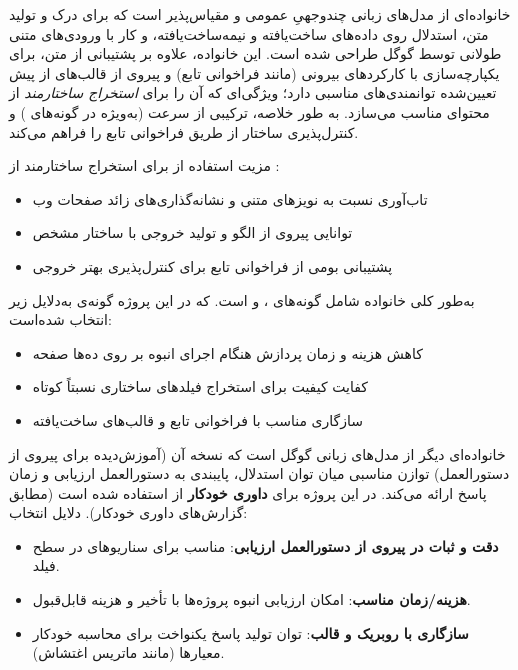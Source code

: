 

\textbf{} خانواده‌ای از مدل‌های زبانی چندوجهیِ عمومی و مقیاس‌پذیر است که برای درک و تولید متن، استدلال روی داده‌های ساخت‌یافته و نیمه‌ساخت‌یافته، و کار با ورودی‌های متنی طولانی توسط گوگل طراحی شده است. این خانواده، علاوه بر پشتیبانی از متن، برای یکپارچه‌سازی با کارکردهای بیرونی (مانند فراخوانی تابع) و پیروی از قالب‌های از پیش تعیین‌شده توانمندی‌های مناسبی دارد؛ ویژگی‌ای که آن را برای \textit{استخراج ساختارمند} از محتوای  مناسب می‌سازد. به طور خلاصه،  ترکیبی از سرعت (به‌ویژه در گونه‌های ) و کنترل‌پذیری ساختار از طریق فراخوانی تابع را فراهم می‌کند.

مزیت استفاده از \textbf{} برای استخراج ساختارمند از :
\begin{itemize}
\item تاب‌آوری نسبت به نویزهای متنی و نشانه‌گذاری‌های زائد صفحات وب
\item توانایی پیروی از الگو و تولید خروجی با ساختار مشخص
\item پشتیبانی بومی از فراخوانی تابع برای کنترل‌پذیری بهتر خروجی
\end{itemize}

به‌طور کلی خانواده \textit{} شامل گونه‌های \textit{}، \textit{} و \textit{} است. که در این پروژه   گونه‌ی \textit{} به‌دلایل زیر انتخاب شده‌است:
\begin{itemize}
\item کاهش هزینه و زمان پردازش هنگام اجرای انبوه بر روی ده‌ها صفحه 
\item کفایت کیفیت برای استخراج فیلدهای ساختاری نسبتاً کوتاه
\item سازگاری مناسب با فراخوانی تابع و قالب‌های ساخت‌یافته
\end{itemize}


\textbf{} خانواده‌ای دیگر از مدل‌های زبانی گوگل است که نسخه  آن (آموزش‌دیده برای پیروی از دستورالعمل) توازن مناسبی میان توان استدلال، پایبندی به دستورالعمل ارزیابی و زمان پاسخ ارائه می‌کند. در این پروژه برای \textbf{داوری خودکار} از  استفاده شده است (مطابق گزارش‌های داوری خودکار). دلایل انتخاب:
\begin{itemize}
\item \textbf{دقت و ثبات در پیروی از دستورالعمل ارزیابی}: مناسب برای سناریوهای  در سطح فیلد.
\item \textbf{هزینه/زمان مناسب}: امکان ارزیابی انبوه پروژه‌ها با تأخیر و هزینه قابل‌قبول.
\item \textbf{سازگاری با روبریک و قالب}: توان تولید پاسخ یکنواخت برای محاسبه خودکار معیارها (مانند ماتریس اغتشاش).
\end{itemize}

